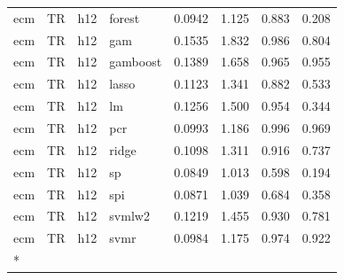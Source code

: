 \begin{ThreePartTable}
\begin{longtable}[t]{llclcccc}
ecm & TR & h12 & forest & 0.0942 & 1.125 & 0.883 & 0.208\\
ecm & TR & h12 & gam & 0.1535 & 1.832 & 0.986 & 0.804\\
ecm & TR & h12 & gamboost & 0.1389 & 1.658 & 0.965 & 0.955\\
ecm & TR & h12 & lasso & 0.1123 & 1.341 & 0.882 & 0.533\\
ecm & TR & h12 & lm & 0.1256 & 1.500 & 0.954 & 0.344\\
ecm & TR & h12 & pcr & 0.0993 & 1.186 & 0.996 & 0.969\\
ecm & TR & h12 & ridge & 0.1098 & 1.311 & 0.916 & 0.737\\
ecm & TR & h12 & sp & 0.0849 & 1.013 & 0.598 & 0.194\\
ecm & TR & h12 & spi & 0.0871 & 1.039 & 0.684 & 0.358\\
ecm & TR & h12 & svmlw2 & 0.1219 & 1.455 & 0.930 & 0.781\\
ecm & TR & h12 & svmr & 0.0984 & 1.175 & 0.974 & 0.922\\*
\end{longtable}
\end{ThreePartTable}
\endgroup{}
